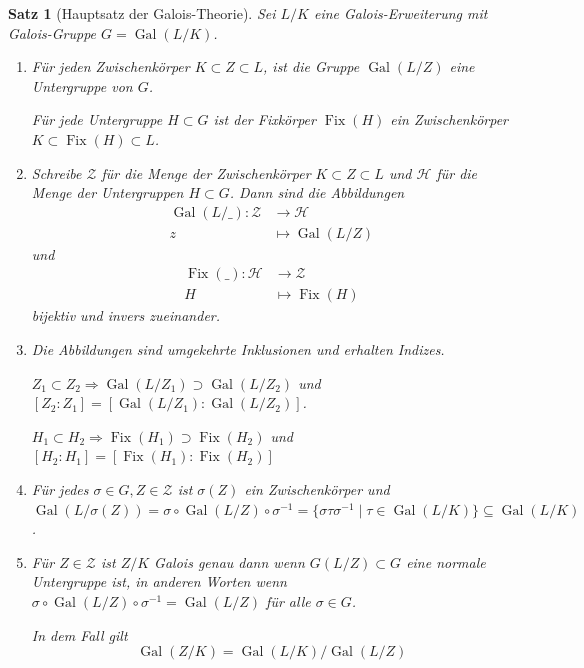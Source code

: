 \documentclass[a4paper,12pt,numbers=noenddot,parskip=full]{scrartcl}
\DeclareMathOperator{\Gal}{Gal}
\theoremstyle{dotless}
\newtheorem{theorem}{Satz}[section]
\theoremstyle{remark}
\begin{document}
	\begin{theorem}[Hauptsatz der Galois-Theorie]
		Sei $L/K$ eine Galois-Erweiterung mit Galois-Gruppe $G = \Gal(L/K)$.
		\begin{enumerate}
			\item Für jeden Zwischenkörper $K \subset Z  \subset L$, ist die Gruppe $\Gal(L/Z)$ eine Untergruppe von $G$.
			
			Für jede Untergruppe $H \subset G$ ist der Fixkörper $\operatorname{Fix}(H)$ ein Zwischenkörper $K \subset \operatorname{Fix}(H) \subset L$.
			
			\item Schreibe $\mathcal{Z}$ für die Menge der Zwischenkörper $K \subset Z \subset L$ und $\mathcal{H}$ für die Menge der Untergruppen $H \subset G$. Dann sind die Abbildungen
			\begin{align*}
				\Gal(L/\_): \mathcal{Z} &\to \mathcal{H} \\
				z &\mapsto \Gal(L/Z)
			\end{align*}
			und
			\begin{align*}
				\operatorname{Fix}(\_): \mathcal{H} &\to \mathcal{Z} \\
				H &\mapsto \operatorname{Fix}(H)
			\end{align*}
			bijektiv und invers zueinander.
			
			\item Die Abbildungen sind umgekehrte Inklusionen und erhalten Indizes.
			
			$Z_1 \subset Z_2 \Rightarrow \Gal(L/Z_1) \supset \Gal(L/Z_2)$ und $[Z_2: Z_1] = [\Gal(L/Z_1):\Gal(L/Z_2)]$.
			
			$H_1 \subset H_2 \Rightarrow \operatorname{Fix}(H_1) \supset \operatorname{Fix}(H_2)$ und $[H_2:H_1] = [\operatorname{Fix}(H_1): \operatorname{Fix}(H_2)]$
			
			\item Für jedes $\sigma \in G, Z \in \mathcal{Z}$ ist $\sigma(Z)$ ein Zwischenkörper und $\Gal(L/\sigma(Z)) = \sigma \circ \Gal(L/Z) \circ \sigma^{-1} = \{ \sigma \tau \sigma^{-1} \mid \tau \in \Gal(L/K) \} \subseteq \Gal(L/K)$.
			
			\item Für $Z \in \mathcal{Z}$ ist $Z/K$ Galois genau dann wenn $G(L/Z) \subset G$ eine normale Untergruppe ist, in anderen Worten wenn $\sigma \circ \Gal(L/Z) \circ \sigma^{-1} = \Gal(L/Z)$ für alle $\sigma \in G$.
			
			In dem Fall gilt
			\begin{equation*}
				\Gal(Z/K) = \Gal(L/K) / \Gal(L/Z)
			\end{equation*}
		\end{enumerate}
	\end{theorem}
\end{document}
